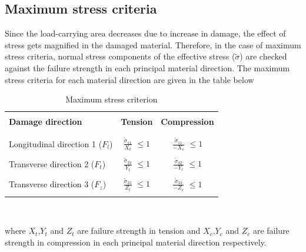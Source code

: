 \documentclass[12pt,a4paper,twoside,openright]{report}
\begin{document}
\subsection{Maximum stress criteria}\label{Maximum stress criteria}
\indent\indent\indent  Since the load-carrying area decreases due to increase in damage, the effect of stress gets magnified in the damaged material. Therefore, in the case of maximum stress criteria, normal stress components of the effective stress ($\tilde{\sigma}$) are checked against the failure strength in each principal material direction. The maximum stress criteria \citep{jiang2018evaluations} for each material direction are given in the table below 
\begin{table}[htbp]
  \begin{center}
     \begin{tabular}{l  c  c} 
     \hline
     \\
      \textbf{Damage direction} \;\;& \textbf{Tension} \;& \textbf{Compression}\\
      \\
      \hline
      \\
      Longitudinal direction 1 ($F_{l}$) & \Large{$\frac{\tilde{\sigma}_{11}}{X_{t}} $}\small{ $\leq 1$} & \Large{$\frac{\tilde{\sigma}_{11}}{-X_{c}} $}\small{ $\leq 1$} \\
      \\
      Transverse direction 2 ($F_{t}$)  &  \Large{$\frac{\tilde{\sigma}_{22}}{Y_{t}} $}\small{ $\leq 1$}  & \Large{$\frac{\tilde{\sigma}_{22}}{-Y_{c}} $}\small{ $\leq 1$}\\
      \\
      Transverse direction 3 ($F_{z}$) &  \Large{$\frac{\tilde{\sigma}_{33}}{Z_{t}} $}\small{ $\leq 1$}  &   \Large{$\frac{\tilde{\sigma}_{33}}{-Z_{c}} $}\small{ $\leq 1$}\\
       \\
       \hline
    \end{tabular}
    \\
    \caption{Maximum stress criterion}
    \label{tab:Maximum stress criterion}
  \end{center}
\end{table}
\FloatBarrier
where $X_{t}$,$ Y_{t} $ and $Z_{t}$ are failure strength in tension and $X_{c}$,$ Y_{c} $ and $Z_{c}$ are failure strength in compression in each principal material direction respectively.
\end{document}
